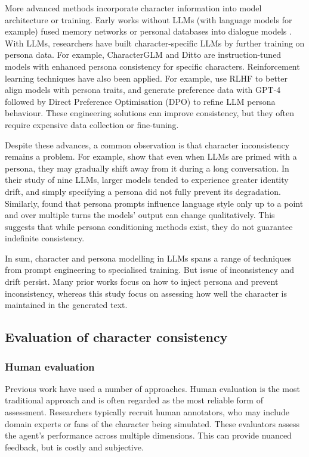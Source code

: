 \documentclass{article}
\begin{document}
More advanced methods incorporate character information into model architecture or training. Early works without LLMs (with language models for example) fused memory networks or personal databases into dialogue models \citep{zhang2018personalizing}. With LLMs, researchers have built character-specific LLMs by further training on persona data. For example, CharacterGLM \citep{zhou2023characterglm} and Ditto \citep{li2021ditto, lu2024large} are instruction-tuned models with enhanced persona consistency for specific characters. Reinforcement learning techniques have also been applied. For example, \cite{shea2023building} use RLHF to better align models with persona traits, and \cite{chen2025compress} generate preference data with GPT-4 followed by Direct Preference Optimisation (DPO) to refine LLM persona behaviour. These engineering solutions can improve consistency, but they often require expensive data collection or fine-tuning.

Despite these advances, a common observation is that character inconsistency remains a problem. For example, \cite{choi2024examining} show that even when LLMs are primed with a persona, they may gradually shift away from it during a long conversation. In their study of nine LLMs, larger models tended to experience greater identity drift, and simply specifying a persona did not fully prevent its degradation. Similarly, \citep{frisch2024llm} found that persona prompts influence language style only up to a point and over multiple turns the models' output can change qualitatively. This suggests that while persona conditioning methods exist, they do not guarantee indefinite consistency.

In sum, character and persona modelling in LLMs spans a range of techniques from prompt engineering to specialised training. But issue of inconsistency and drift persist. Many prior works focus on how to inject persona and prevent inconsistency, whereas this study focus on assessing how well the character is maintained in the generated text.

\subsection{Evaluation of character consistency}

\subsubsection{Human evaluation}

Previous work have used a number of approaches. Human evaluation is the most traditional approach and is often regarded as the most reliable form of assessment. Researchers typically recruit human annotators, who may include domain experts or fans of the character being simulated. These evaluators assess the agent’s performance across multiple dimensions. This can provide nuanced feedback, but is costly and subjective. 
\end{document}

